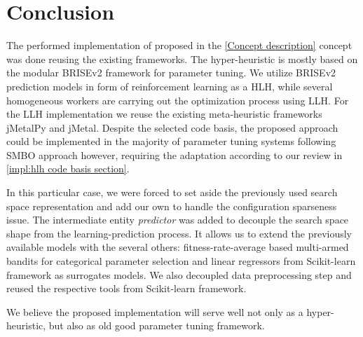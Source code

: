 \section{Conclusion}
The performed implementation of proposed in the \cref{Concept description} concept was done reusing the existing frameworks. The hyper-heuristic is mostly based on the modular BRISEv2 framework for parameter tuning. We utilize BRISEv2 prediction models in form of reinforcement learning as a HLH, while several homogeneous workers are carrying out the optimization process using LLH. For the LLH implementation we reuse the existing meta-heuristic frameworks jMetalPy and jMetal. Despite the selected code basis, the proposed approach could be implemented in the majority of parameter tuning systems following SMBO approach however, requiring the adaptation according to our review in \cref{impl:hlh code basis section}.

In this particular case, we were forced to set aside the previously used search space representation and add our own to handle the configuration sparseness issue. The intermediate entity \emph{predictor} was added to decouple the search space shape from the learning-prediction process. It allows us to extend the previously available models with the several others: fitness-rate-average based multi-armed bandits for categorical parameter selection and linear regressors from Scikit-learn framework as surrogates models. We also decoupled data preprocessing step and reused the respective tools from Scikit-learn framework.

We believe the proposed implementation will serve well not only as a hyper-heuristic, but also as old good parameter tuning framework.
